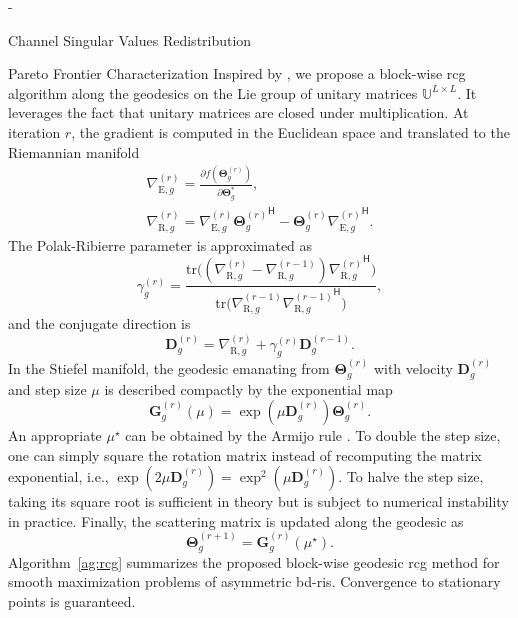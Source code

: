 \begin{section}{-}
\begin{subsection}{Channel Singular Values Redistribution}
\begin{subsubsection}{Pareto Frontier Characterization}
			Inspired by \cite{Abrudan2008,Abrudan2009}, we propose a block-wise \gls{rcg} algorithm along the geodesics on the Lie group of unitary matrices $\mathbb{U}^{L \times L}$.
			It leverages the fact that unitary matrices are closed under multiplication.
			At iteration $r$, the gradient is computed in the Euclidean space and translated to the Riemannian manifold \cite{Absil2009}
			\begin{gather}
				\nabla_{\mathrm{E},g}^{(r)} = \frac{\partial f(\mathbf{\Theta}_g^{(r)})}{\partial \mathbf{\Theta}_g^*},\label{eq:gradient_euclidean}\\
				\nabla_{\mathrm{R},g}^{(r)} = \nabla_{\mathrm{E},g}^{(r)} {\mathbf{\Theta}_g^{(r)}}^\mathsf{H} - \mathbf{\Theta}_g^{(r)} {\nabla_{\mathrm{E},g}^{(r)}}^\mathsf{H}.\label{eq:gradient_riemannian} %
			\end{gather}
			The Polak-Ribierre parameter \cite{Polak1969} is approximated as \cite{Abrudan2009}
			\begin{equation}
				\gamma_g^{(r)} = \frac{\mathrm{tr}\bigl((\nabla_{\mathrm{R},g}^{(r)} - \nabla_{\mathrm{R},g}^{(r-1)}) {\nabla_{\mathrm{R},g}^{(r)}}^\mathsf{H}\bigr)}{\mathrm{tr}\bigl(\nabla_{\mathrm{R},g}^{(r-1)} {\nabla_{\mathrm{R},g}^{(r-1)}}^\mathsf{H}\bigr)}, %
				\label{eq:parameter_cg}
			\end{equation}
			and the conjugate direction is
			\begin{equation}
				\mathbf{D}_g^{(r)} = \nabla_{\mathrm{R},g}^{(r)} + \gamma_g^{(r)} \mathbf{D}_g^{(r-1)}. %
				\label{eq:direction_cg}
			\end{equation}
			In the Stiefel manifold, the geodesic emanating from $\mathbf{\Theta}_g^{(r)}$ with velocity $\mathbf{D}_g^{(r)}$ and step size $\mu$ is described compactly by the exponential map \cite{Edelman1998}
			\begin{equation}
				\mathbf{G}_g^{(r)}(\mu) = \exp(\mu \mathbf{D}_g^{(r)}) \mathbf{\Theta}_g^{(r)}. %
				\label{eq:geodesic}
			\end{equation}
			An appropriate $\mu^\star$ can be obtained by the Armijo rule \cite{Armijo1966}.
			To double the step size, one can simply square the rotation matrix instead of recomputing the matrix exponential, i.e., $\exp(2 \mu \mathbf{D}_g^{(r)}) = \exp^2(\mu \mathbf{D}_g^{(r)})$.
			To halve the step size, taking its square root is sufficient in theory but is subject to numerical instability in practice.
			Finally, the scattering matrix is updated along the geodesic as
			\begin{equation}
				\mathbf{\Theta}_g^{(r+1)} = \mathbf{G}_g^{(r)}(\mu^\star).
				\label{eq:update_geodesic}
			\end{equation}
			Algorithm~\ref{ag:rcg} summarizes the proposed block-wise geodesic \gls{rcg} method for smooth maximization problems of asymmetric \gls{bd}-\gls{ris}.
			Convergence to stationary points is guaranteed.


\end{subsubsection}
\end{subsection}
\end{section}
